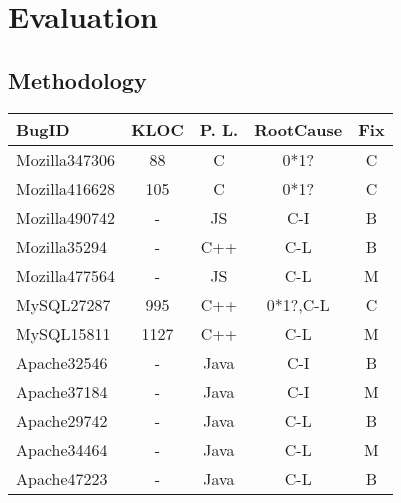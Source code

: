 \section{Evaluation}
\label{sec:experiment}

\subsection{Methodology}
\label{sec:result_meth}


\begin{table}
  \centering
  \small
  \newcommand{\Yes}[1]{\checkmark{}$_#1$}
  \newcommand{\No}[0]{-}
  \begin{tabular}{lcccc}
    \toprule
   {\bf BugID}           &  {\bf KLOC}     &  {\bf P. L.}           & {\bf RootCause}  & {\bf Fix}\\
   \midrule
   Mozilla347306         & 88              & C                      &  0*1?        & C     \\
   Mozilla416628         & 105             & C                      &  0*1?        & C     \\
   Mozilla490742         &  -             & JS                     &  C-I         & B       \\
   Mozilla35294          &  -             & C++                    &  C-L         & B        \\ 
   Mozilla477564         &  -             & JS                     &  C-L         & M       \\
   \midrule 
   MySQL27287            & 995             & C++                    &  0*1?,C-L        & C     \\
   MySQL15811            & 1127            & C++                    &  C-L         & M \\ 
   \midrule    
   Apache32546           &  -             & Java                   &  C-I         & B  \\
   Apache37184           &  -             & Java                   &  C-I         & M  \\
   Apache29742           &  -             & Java                   &  C-L         & B \\ 
   Apache34464           &  -             & Java                   &  C-L         & M  \\
   Apache47223           &  -             & Java                   &  C-L         & B \\
   \midrule

\end{tabular}
\end{table}
